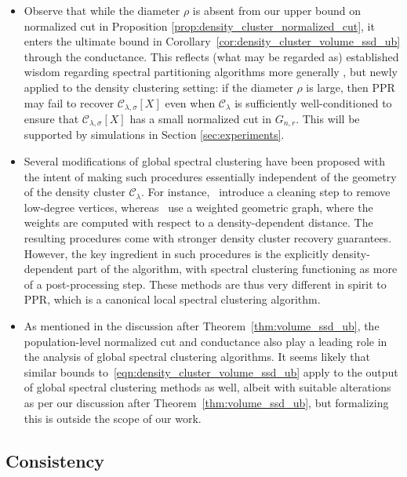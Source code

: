 \documentclass[11pt,twoside]{article}
\newcommand{\1}{\mathbf{1}}
\newcommand{\mc}[1]{\mathcal{#1}}
\begin{document}
\begin{itemize}
	\item Observe that while the diameter $\rho$ is absent from our upper bound on normalized cut in Proposition \ref{prop:density_cluster_normalized_cut}, it enters the ultimate bound in Corollary~\ref{cor:density_cluster_volume_ssd_ub} through the conductance. This reflects
	(what may be regarded as) established wisdom regarding spectral partitioning
	algorithms more generally \citep{guattery1995, hein2010}, but newly applied
	to the density clustering setting: if the diameter $\rho$ is large, then PPR
	may fail to recover $\mc{C}_{\lambda,\sigma}[X]$ even when $\mc{C}_{\lambda}$ is sufficiently well-conditioned to ensure that $\mc{C}_{\lambda,\sigma}[X]$ has a small normalized cut in $G_{n,r}$. This will be supported by simulations in Section \ref{sec:experiments}.   
	\item Several modifications of global spectral clustering have been proposed with the intent of making such procedures essentially independent of the geometry of the density cluster $\mc{C}_{\lambda}$. For instance,~\citep{pelletier2011,arias-castro2009} introduce a cleaning step to remove low-degree vertices, whereas~\cite{little2020} use a weighted geometric graph, where the weights are computed with respect to a density-dependent distance. The resulting procedures come with stronger density cluster recovery guarantees. However, the key ingredient in such procedures is the explicitly density-dependent part of the algorithm, with spectral clustering functioning as more of a post-processing step. These methods are thus very different in spirit to PPR, which is a canonical local spectral clustering algorithm. 
	\item As mentioned in the discussion after Theorem~\ref{thm:volume_ssd_ub}, the population-level normalized cut and conductance also play a leading role in the analysis of global spectral clustering algorithms. It seems likely that similar bounds to~\eqref{eqn:density_cluster_volume_ssd_ub} apply to the output of global spectral clustering methods as well, albeit with suitable alterations as per our discussion after Theorem~\ref{thm:volume_ssd_ub}, but formalizing this is outside the scope of our work.
\end{itemize}

\subsection{Consistency}
\label{subsec:consistent_recovery_density_clusters}
\end{document}
